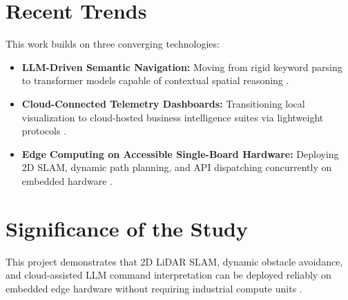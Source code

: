 \section{Recent Trends}
This work builds on three converging technologies:
\begin{itemize}
    \item \textbf{LLM-Driven Semantic Navigation:} Moving from rigid keyword parsing to transformer models capable of contextual spatial reasoning \cite{brown2020language, openai2024gpt}.
    \item \textbf{Cloud-Connected Telemetry Dashboards:} Transitioning local visualization to cloud-hosted business intelligence suites via lightweight protocols \cite{oasis2019mqtt, microsoft2024powerbi}.
    \item \textbf{Edge Computing on Accessible Single-Board Hardware:} Deploying 2D SLAM, dynamic path planning, and API dispatching concurrently on embedded hardware \cite{siegwart2011introduction}.
\end{itemize}

\section{Significance of the Study}
This project demonstrates that 2D LiDAR SLAM, dynamic obstacle avoidance, and cloud-assisted LLM command interpretation can be deployed reliably on embedded edge hardware without requiring industrial compute units \cite{thrun2005probabilistic, macenski2021slam, openrobotics2024nav2}.